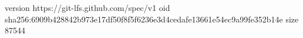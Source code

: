 version https://git-lfs.github.com/spec/v1
oid sha256:6909b428842b973e17df50f8f5f6236e3d4cedafe13661e54ec9a99fe352b14e
size 87544
